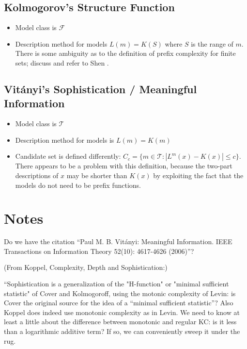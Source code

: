 \documentclass{style/llncs}
\newcommand{\T}{\mathcal T}
\newcommand{\F}{\mathcal F}
\begin{document}
\subsection{Kolmogorov's Structure Function}

\begin{itemize}
\item Model class is $\F$
\item Description method for models $L(m)=K(S)$ where $S$ is the range
  of $m$. There is some ambiguity as to the definition of prefix
  complexity for finite sets; discuss and refer to Shen \cite{TODO}.
\end{itemize}

\subsection{Vit\'anyi's Sophistication / Meaningful Information}

\begin{itemize}
\item Model class is $\T$
\item Description method for models is $L(m)=K(m)$
\item Candidate set is defined differently: $C_c=\{m\in\T:|L^m(x)-K(x)|\le
  c\}$. There appears to be a problem with this definition, because
  the two-part descriptions of $x$ may be shorter than $K(x)$ by
  exploiting the fact that the models do not need to be prefix functions.
\end{itemize}

% 


\section{Notes}

Do we have the citation ``Paul M. B. Vit\'anyi: Meaningful Information. IEEE Transactions on Information Theory 52(10): 4617-4626 (2006)''?

(From Koppel, Complexity, Depth and Sophistication:)

``Sophistication is a generalization of the "H-function" or "minimal sufficient statistic" of Cover and Kolmogoroff, using the motonic complexity of Levin: is Cover the original source for the idea of a ``minimal sufficient statistic''? Also Koppel does indeed use monotonic complexity as in Levin. We need to know at least a little about the difference between monotonic and regular KC: is it less than a logarithmic additive term? If so, we can conveniently sweep it under the rug.
\end{document}
